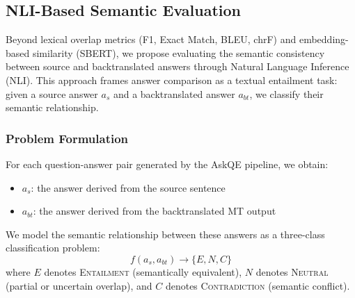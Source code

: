 

    \subsection{NLI-Based Semantic Evaluation}
    \label{sec:nli_methodology}

    Beyond lexical overlap metrics (F1, Exact Match, BLEU, chrF) and embedding-based similarity (SBERT), we propose evaluating the semantic consistency between source and backtranslated answers through Natural Language Inference (NLI). This approach frames answer comparison as a textual entailment task: given a source answer $a_s$ and a backtranslated answer $a_{bt}$, we classify their semantic relationship.

    \subsubsection{Problem Formulation}

    For each question-answer pair generated by the AskQE pipeline, we obtain:
    \begin{itemize}
        \item $a_s$: the answer derived from the source sentence
        \item $a_{bt}$: the answer derived from the backtranslated MT output
    \end{itemize}

    We model the semantic relationship between these answers as a three-class classification problem:
    \begin{equation}
        f(a_s, a_{bt}) \rightarrow \{E, N, C\}
    \end{equation}
    where $E$ denotes \textsc{Entailment} (semantically equivalent), $N$ denotes \textsc{Neutral} (partial or uncertain overlap), and $C$ denotes \textsc{Contradiction} (semantic conflict).

